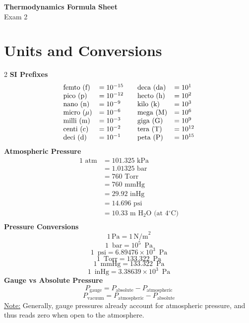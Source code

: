 \documentclass[10pt, fleqn]{article}
\begin{document}
\begin{center}
    \Large \textbf{Thermodynamics Formula Sheet} \\
    \normalsize Exam 2
\end{center}
    \section*{Units and Conversions}
    \vspace{-1em}
\begin{multicols}{2}\noindent
\textbf{SI Prefixes}
\makeatletter
\@fleqnfalse
\makeatother
\[
\begin{array}{ll@{\qquad}ll}
\text{femto (f)} &= 10^{-15} & \text{deca (da)} &= 10^{1} \\
\text{pico (p)} &= 10^{-12} & \text{hecto (h)} &= 10^{2} \\
\text{nano (n)} &= 10^{-9}  & \text{kilo (k)} &= 10^{3} \\
\text{micro ($\mu$)} &= 10^{-6} & \text{mega (M)} &= 10^{6} \\
\text{milli (m)} &= 10^{-3} & \text{giga (G)} &= 10^{9} \\
\text{centi (c)} &= 10^{-2} & \text{tera (T)} &= 10^{12} \\
\text{deci (d)} &= 10^{-1}  & \text{peta (P)} &= 10^{15}
\end{array}
\]
\makeatletter
\@fleqntrue
\makeatother
\textbf{Atmospheric Pressure}
\[\begin{aligned}
1 \text{ atm} &= 101.325 \text{ kPa} \\
&= 1.01325 \text{ bar} \\
&= 760 \text{ Torr} \\
&= 760 \text{ mmHg} \\
&= 29.92 \text{ inHg} \\
&= 14.696 \text{ psi}\\
&= 10.33 \text{ m H}_2\text{O (at 4$^\circ$C)} \\
\end{aligned}\]
\textbf{Pressure Conversions}
\[1\,\text{Pa} = 1\,\text{N/m}^2\]
\[1\, \text{ bar} = 10^{5}\, \text{ Pa}\]
\[1\, \text{ psi} = 6.89476 \times 10^{3}\, \text{ Pa}\]
\[1\, \text{ Torr} = 133.322\, \text{ Pa}\]
\[1\, \text{ mmHg} = 133.322\, \text{ Pa}\]
\[1\, \text{ inHg} = 3.38639 \times 10^{3}\, \text{ Pa}\]
\textbf{Gauge vs Absolute Pressure}
\[P_{\text{gauge}} = P_{\text{absolute}} - P_{\text{atmospheric}}\]
\[P_{\text{vacuum}} = P_{\text{atmospheric}} - P_{\text{absolute}}\]
\underline{Note:} Generally, gauge pressures already account for atmospheric pressure, and thus reads zero when open to the atmosphere.\\

\end{multicols}
\end{document}
